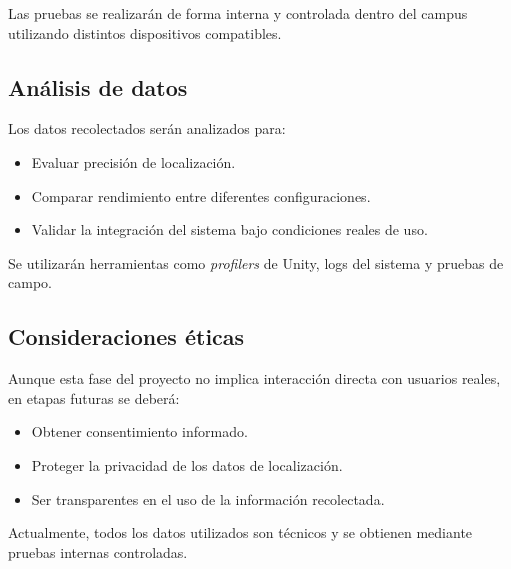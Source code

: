 \documentclass{article}
\begin{document}
Las pruebas se realizarán de forma interna y controlada dentro del campus utilizando distintos dispositivos compatibles.

\subsection{Análisis de datos}

Los datos recolectados serán analizados para:

\begin{itemize}
    \item Evaluar precisión de localización.
    \item Comparar rendimiento entre diferentes configuraciones.
    \item Validar la integración del sistema bajo condiciones reales de uso.
\end{itemize}

Se utilizarán herramientas como \textit{profilers} de Unity, logs del sistema y pruebas de campo.

\subsection{Consideraciones éticas}

Aunque esta fase del proyecto no implica interacción directa con usuarios reales, en etapas futuras se deberá:

\begin{itemize}
    \item Obtener consentimiento informado.
    \item Proteger la privacidad de los datos de localización.
    \item Ser transparentes en el uso de la información recolectada.
\end{itemize}

Actualmente, todos los datos utilizados son técnicos y se obtienen mediante pruebas internas controladas.

\newpage
\end{document}
